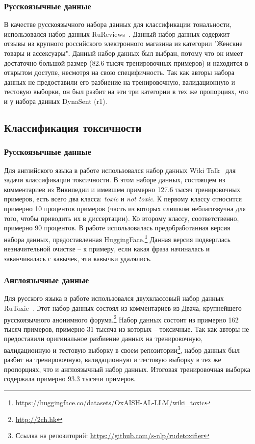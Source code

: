 \subsubsection{Русскоязычные данные} 
В качестве русскоязычного набора данных для классификации тональности, использовался набор данных {RuReviews}~\cite{ru_sentiment}. Данный набор данных содержит отзывы из крупного российского электронного магазина из категории "Женские товары и ассексуары". Данный набор данных был выбран, потому что он имеет достаточно большой размер (82.6 тысяч тренировочных примеров) и находится в открытом доступе, несмотря на свою специфичность. Так как авторы набора данных не предоставили его разбиение на тренировочную, валидационную и тестовую выборки, он был разбит на эти три категории в тех же пропорциях, что и у набора данных {DynaSent} (r1).

\subsection{Классификация токсичности}
\subsubsection{Русскоязычные данные}
Для английского языка в работе использовался набор данных {Wiki Talk}~\cite{toxic} для задачи классификации токсичности. В этом наборе данных, состоящем из комментариев из Википедии и имевшем примерно 127.6 тысяч тренировочных примеров, есть всего два класса: \textit{toxic} и \textit{not toxic}. К первому классу относится примерно 10 процентов примеров (часть из которых слишком неблагозвучна для того, чтобы приводить их в диссертации). Ко второму классу, соответственно, примерно 90 процентов.  В работе использовалась предобработанная версия набора данных, предоставленная HuggingFace.\footnote{\url{https://huggingface.co/datasets/OxAISH-AL-LLM/wiki_toxic}} Данная версия подверглась незначительной очистке -- к примеру, если какая фраза начиналась и заканчивалась с кавычек, эти кавычки удалялись.
\subsubsection{Англоязычные данные}
Для русского языка в работе использовался двухклассовый набор данных {RuToxic}~\cite{ru_toxic}. Этот набор данных состоял из комментариев из Двача, крупнейшего русскоязычного анонимного форума.\footnote{\url{http://2ch.hk}} Набор данных состоит из примерно 162 тысяч примеров, примерно 31 тысяча из которых -- токсичные. Так как авторы не предоставили оригинальное разбиение данных на тренировочную, валидационную и тестовую выборку в своем репозитории\footnote{Ссылка на репозиторий: \url{https://github.com/s-nlp/rudetoxifier}}, набор данных был разбит на тренировочную, валидационную и тестовую выборку в тех же пропорциях, что и англоязычный набор данных. Итоговая тренировочная выборка содержала примерно 93.3 тысячи примеров.

